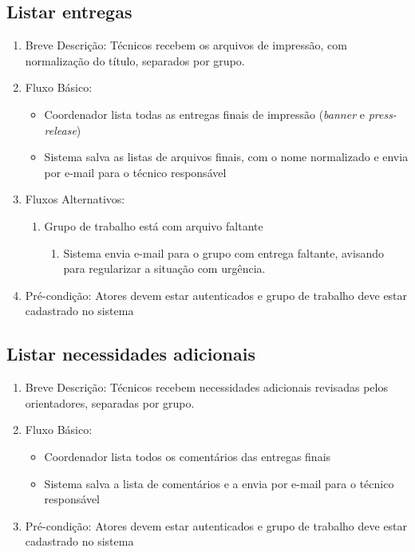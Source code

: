 \subsection{Listar entregas}
\begin{enumerate}
    \item Breve Descrição: Técnicos recebem os arquivos de impressão, com normalização do título, separados por grupo.
    \item Fluxo Básico:
    \begin{itemize}
        \item Coordenador lista todas as entregas finais de impressão (\textit{banner} e \textit{press-release})
        \item Sistema salva as listas de arquivos finais, com o nome normalizado e envia por e-mail para o técnico responsável
    \end{itemize}
    \item Fluxos Alternativos:
    \begin{enumerate}
        \item Grupo de trabalho está com arquivo faltante
        \begin{enumerate}
            \item Sistema envia e-mail para o grupo com entrega faltante, avisando para regularizar a situação com urgência.
        \end{enumerate}
    \end{enumerate}
    \item Pré-condição: Atores devem estar autenticados e grupo de trabalho deve estar cadastrado no sistema
\end{enumerate}

\subsection{Listar necessidades adicionais}
\begin{enumerate}
    \item Breve Descrição: Técnicos recebem necessidades adicionais revisadas pelos orientadores, separadas por grupo.
    \item Fluxo Básico:
    \begin{itemize}
        \item Coordenador lista todos os comentários das entregas finais
        \item Sistema salva a lista de comentários e a envia por e-mail para o técnico responsável
    \end{itemize}
    \item Pré-condição: Atores devem estar autenticados e grupo de trabalho deve estar cadastrado no sistema
\end{enumerate}

